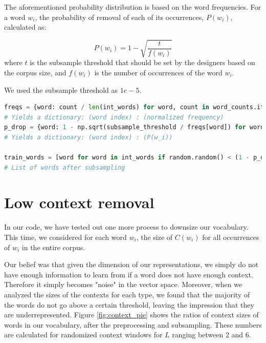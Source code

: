 The aforementioned probability distribution is based on the word frequencies. For a word $w_i$, the probability of removal of each of its occurrences, $P(w_i)$, calculated as:


\[
P(w_i) = 1 - \sqrt{\frac{t}{f(w_i)}}
\]
\noindent
where $t$ is the subsample threshold that should be set by the designers based on the corpus size, and $f(w_i)$ is the number of occurrences of the word $w_i$.

We used the subsample threshold as $1e-5$.


\begin{lstlisting}[language=Python, caption=Subsampling]
freqs = {word: count / len(int_words) for word, count in word_counts.items()} 
# Yields a dictionary: (word index) : (normalized frequency)
p_drop = {word: 1 - np.sqrt(subsample_threshold / freqs[word]) for word in word_counts} 
# Yields a dictionary: (word index) : (P(w_i))

train_words = [word for word in int_words if random.random() < (1 - p_drop[word])] 
# List of words after subsampling

\end{lstlisting}


\section{Low context removal}
\label{sec:lowcontext}

In our code, we have tested out one more process to downsize our vocabulary. This time, we considered for each word $w_i$, the size of $C(w_i)$ for all occurrences of $w_i$ in the entire corpus. 

Our belief was that given the dimension of our representations, we simply do not have enough information to learn from if a word does not have enough context. Therefore it simply becomes "noise" in the vector space. Moreover, when we analyzed the sizes of the contexts for each type, we found that the majority of the words do not go above a certain threshold, leaving the impression that they are underrepresented. Figure \ref{fig:context_pie} shows the ratios of context sizes of words in our vocabulary, after the preprocessing and subsampling. These numbers are calculated for randomized context windows for $L$ ranging between $2$ and $6$.

